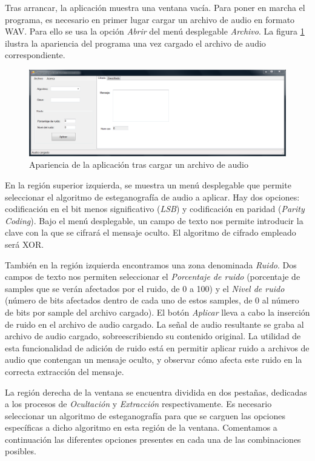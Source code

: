 \documentclass[12pt]{article}
\begin{document}
Tras arrancar, la aplicación muestra una ventana vacía. Para poner en marcha el programa, es necesario en primer lugar cargar un archivo de audio en formato WAV. Para ello se usa la opción \emph{Abrir} del menú desplegable \emph{Archivo}. La figura \ref{ss1} ilustra la apariencia del programa una vez cargado el archivo de audio correspondiente.

\begin{figure}[h]
  \centering
    \includegraphics[width=\textwidth]{img/ss1}
  \caption{Apariencia de la aplicación tras cargar un archivo de audio}
  \label{ss1}
\end{figure}

En la región superior izquierda, se muestra un menú desplegable que permite seleccionar el algoritmo de esteganografía de audio a aplicar. Hay dos opciones: codificación en el bit menos significativo (\emph{LSB}) y codificación en paridad (\emph{Parity Coding}). Bajo el menú desplegable, un campo de texto nos permite introducir la clave con la que se cifrará el mensaje oculto. El algoritmo de cifrado empleado será XOR.

También en la región izquierda encontramos una zona denominada \emph{Ruido}. Dos campos de texto nos permiten seleccionar el \emph{Porcentaje de ruido} (porcentaje de samples que se verán afectados por el ruido, de 0 a 100) y el \emph{Nivel de ruido} (número de bits afectados dentro de cada uno de estos samples, de 0 al número de bits por sample del archivo cargado). El botón \emph{Aplicar} lleva a cabo la inserción de ruido en el archivo de audio cargado. La señal de audio resultante se graba al archivo de audio cargado, sobreescribiendo su contenido original. La utilidad de esta funcionalidad de adición de ruido está en permitir aplicar ruido a archivos de audio que contengan un mensaje oculto, y observar cómo afecta este ruido en la correcta extracción del mensaje.

La región derecha de la ventana se encuentra dividida en dos pestañas, dedicadas a los procesos de \emph{Ocultación} y \emph{Extracción} respectivamente. Es necesario seleccionar un algoritmo de esteganografía para que se carguen las opciones específicas a dicho algoritmo en esta región de la ventana. Comentamos a continuación las diferentes opciones presentes en cada una de las combinaciones posibles.
\end{document}
